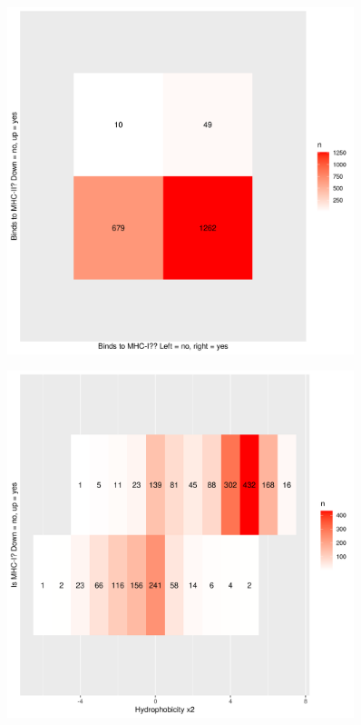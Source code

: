 \begin{figure}[!htbp]
  \includegraphics[width=0.9\textwidth]{p_bind_per_hydrophobicity/binds_mhc1_vs_binds_mhc2.png}
  \caption{
  }
  \label{fig:binds_mhc1_vs_binds_mhc2}
\end{figure}

\begin{figure}[!htbp]
  \includegraphics[width=0.9\textwidth]{p_bind_per_hydrophobicity/hydrophobicity_vs_binds_mhc1.png}
  \caption{
  }
  \label{fig:hydrophobicity_vs_binds_mhc1}
\end{figure}

